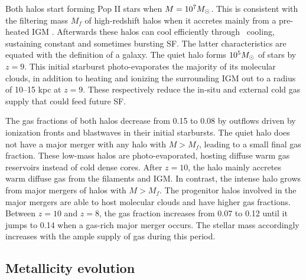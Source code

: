 \documentclass[apjl]{emulateapj}
\begin{document}
Both halos start forming Pop II stars when $M = 10^7 \Ms$.  This is
consistent with the filtering mass $M_f$ of high-redshift halos when
it accretes mainly from a pre-heated IGM \citep{gnedin98, gnedin00,
  Wise08_Gal}.  Afterwards these halos can cool efficiently through
\hh~cooling, sustaining constant and sometimes bursting SF.  The
latter characteristics are equated with the definition of a galaxy.
The quiet halo forms $10^5 \Ms$ of stars by $z=9$.  This initial
starburst photo-evaporates the majority of its molecular clouds, in
addition to heating and ionizing the surrounding IGM out to a radius
of 10--15 kpc at $z=9$.  These respectively reduce the in-situ and
external cold gas supply that could feed future SF.

The gas fractions of both halos decrease from 0.15 to 0.08 by outflows
driven by ionization fronts and blastwaves in their initial
starbursts.  The quiet halo does not have a major merger with any halo
with $M > M_f$, leading to a small final gas fraction.  These low-mass
halos are photo-evaporated, hosting diffuse warm gas reservoirs
instead of cold dense cores.  After $z=10$, the halo mainly accretes
warm diffuse gas from the filaments and IGM.  In contrast, the intense
halo grows from major mergers of halos with $M > M_f$.  The progenitor
halos involved in the major mergers are able to host molecular clouds
and have higher gas fractions.  Between $z=10$ and $z=8$, the gas
fraction increases from 0.07 to 0.12 until it jumps to 0.14 when a
gas-rich major merger occurs.  The stellar mass accordingly increases
with the ample supply of gas during this period.  



\begin{figure*}
\caption{\label{fig:evo} (a) Evolution of the total halo mass (top),
  stellar mass (middle), and gas fraction (bottom) of the quiet
  (dashed) and intense (solid) halos.  In the top panel, the filtering
  halo mass is plotted as the thick black line (overlapping with the
  quiet halo after $z=9$.  (b) Mass-weighted stellar metallicities and
  gas metallicities enriched by Pop II and Pop III SNe of the intense
  (top) and quiet (bottom) halos.}
\end{figure*}


\subsection{Metallicity evolution}
\end{document}
